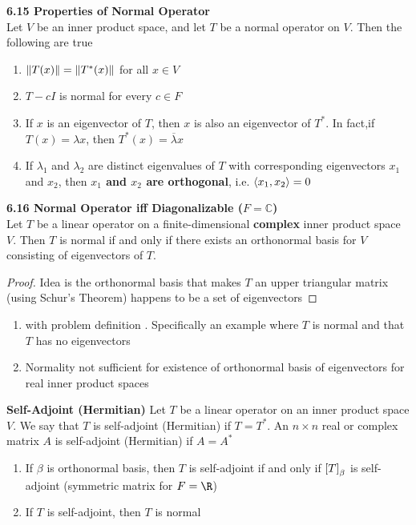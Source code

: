 \documentclass[11pt]{article}
\begin{document}
\begin{theorem*}
    \textbf{6.15 Properties of Normal Operator} \\ 
    Let $V$ be an inner product space, and let $T$ be a normal operator on $V$. Then the following are true
    \begin{enumerate}
        \item $\left\lVert T(x)\right\rVert = \left\lVert T^*(x)\right\rVert$ for all $x\in V$
        \item $T - cI$ is normal for every $c\in F$
        \item If $x$ is an eigenvector of $T$, then $x$ is also an eigenvector of $T^*$. In fact,if $T(x) = \lambda x$, then $T^*(x) = \overline{\lambda} x$
        \item If $\lambda_1$ and $\lambda_2$ are distinct eigenvalues of $T$ with corresponding eigenvectors $x_1$ and $x_2$, then \textbf{$x_1$ and $x_2$ are orthogonal}, i.e. $\langle x_1,x_2\rangle = 0$
    \end{enumerate}
\end{theorem*}

\begin{theorem*}
    \textbf{6.16 Normal Operator iff Diagonalizable ($F=\mathbb{C}$)} \\
    Let $T$ be a linear operator on a finite-dimensional \textbf{complex} inner product space $V$. Then $T$ is normal if and only if there exists an orthonormal basis for $V$ consisting of eigenvectors of $T$.
    \begin{proof}
        Idea is the orthonormal basis that makes $T$ an upper triangular matrix (using Schur's Theorem) happens to be a set of eigenvectors
    \end{proof}
    \begin{enumerate}
        \item {} with problem definition . Specifically an example where $T$ is normal and that $T$ has no eigenvectors
        \item Normality not sufficient for existence of orthonormal basis of eigenvectors for real inner product spaces 
    \end{enumerate}
\end{theorem*}


\begin{defn*}
    \textbf{Self-Adjoint (Hermitian)} Let $T$ be a linear operator on an inner product space $V$. We say that $T$ is self-adjoint (Hermitian) if $T = T^*$. An $n\times n$ real or complex matrix $A$ is self-adjoint (Hermitian) if $A=A^*$
    \begin{enumerate}
        \item If $\beta$ is orthonormal basis, then $T$ is self-adjoint if and only if $\left[ T \right]_{\beta}$ is self-adjoint (symmetric matrix for $F=\R$)
        \item If $T$ is self-adjoint, then $T$ is normal
    \end{enumerate}
\end{defn*}
\end{document}
